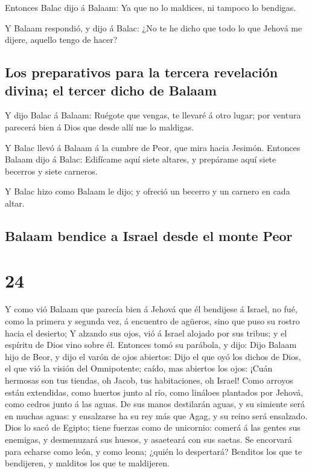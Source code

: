  Entonces Balac dijo á Balaam: Ya que no lo maldices, ni
tampoco lo bendigas.

 Y Balaam respondió, y dijo á Balac: ¿No te he dicho que
todo lo que Jehová me dijere, aquello tengo de hacer?

\hypertarget{los-preparativos-para-la-tercera-revelaciuxf3n-divina-el-tercer-dicho-de-balaam}{%
\subsection{Los preparativos para la tercera revelación divina; el
tercer dicho de
Balaam}\label{los-preparativos-para-la-tercera-revelaciuxf3n-divina-el-tercer-dicho-de-balaam}}

 Y dijo Balac á Balaam: Ruégote que vengas, te llevaré á
otro lugar; por ventura parecerá bien á Dios que desde allí me lo
maldigas.

 Y Balac llevó á Balaam á la cumbre de Peor, que mira
hacia Jesimón.  Entonces Balaam dijo á Balac: Edifícame
aquí siete altares, y prepárame aquí siete becerros y siete carneros.

 Y Balac hizo como Balaam le dijo; y ofreció un becerro y
un carnero en cada altar.

\hypertarget{balaam-bendice-a-israel-desde-el-monte-peor}{%
\subsection{Balaam bendice a Israel desde el monte
Peor}\label{balaam-bendice-a-israel-desde-el-monte-peor}}

\hypertarget{section-23}{%
\section{24}\label{section-23}}

 Y como vió Balaam que parecía bien á Jehová que él
bendijese á Israel, no fué, como la primera y segunda vez, á encuentro
de agüeros, sino que puso su rostro hacia el desierto;  Y
alzando sus ojos, vió á Israel alojado por sus tribus; y el espíritu de
Dios vino sobre él.  Entonces tomó su parábola, y dijo:
Dijo Balaam hijo de Beor, y dijo el varón de ojos abiertos:
 Dijo el que oyó los dichos de Dios, el que vió la visión
del Omnipotente; caído, mas abiertos los ojos:  ¡Cuán
hermosas son tus tiendas, oh Jacob, tus habitaciones, oh Israel!
 Como arroyos están extendidas, como huertos junto al río,
como lináloes plantados por Jehová, como cedros junto á las aguas.
 De sus manos destilarán aguas, y su simiente será en
muchas aguas: y ensalzarse ha su rey más que Agag, y su reino será
ensalzado.  Dios lo sacó de Egipto; tiene fuerzas como de
unicornio: comerá á las gentes sus enemigas, y desmenuzará sus huesos, y
asaeteará con sus saetas.  Se encorvará para echarse como
león, y como leona; ¿quién lo despertará? Benditos los que te
bendijeren, y malditos los que te maldijeren.

